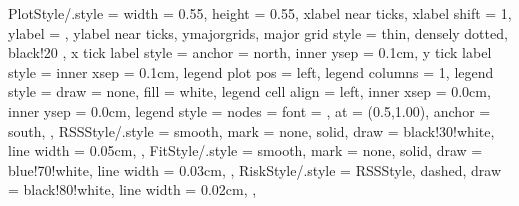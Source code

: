 
\pgfplotsset
{
	PlotStyle/.style =
	{
		width					= 0.55\columnwidth,
		height					= 0.55\columnwidth,
		xlabel near ticks,
		xlabel shift			= 1,
		ylabel					= {},
		ylabel near ticks,
		ymajorgrids,
		major grid style =
		{
			thin,
			densely dotted,
			black!20
		},
		x tick label style		= {anchor = north, inner ysep = 0.1cm},
		y tick label style		= {inner xsep = 0.1cm},
		legend plot pos			= left,
		legend columns			= 1,
		legend style			= {draw = none, fill = white},
		legend cell align		= left,
		inner xsep				= 0.0cm,
		inner ysep				= 0.0cm,
		legend style			=
		{
			nodes				= {font = \scriptsize},
			at					= {(0.5,1.00)},
			anchor				= south,
		}
	},
	RSSStyle/.style =
	{
		smooth,
		mark			= none,
		solid,
		draw			= black!30!white,
		line width		= 0.05cm,
	},
	FitStyle/.style =
	{
		smooth,
		mark			= none,
		solid,
		draw			= blue!70!white,
		line width		= 0.03cm,
	},
	RiskStyle/.style =
	{
		RSSStyle,
		dashed,
		draw			= black!80!white,
		line width		= 0.02cm,
	},
}



